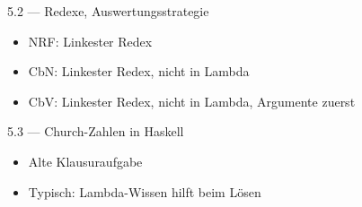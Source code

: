 \documentclass{beamer}
\begin{document}
\begin{frame}{5.2 --- Redexe, Auswertungsstrategie}

    \begin{itemize}
        \item NRF: Linkester Redex
        \item CbN: Linkester Redex, nicht in Lambda
        \item CbV: Linkester Redex, nicht in Lambda, Argumente zuerst
    \end{itemize}
\end{frame}

\begin{frame}{5.3 --- Church-Zahlen in Haskell}

    \begin{itemize}
        \item Alte Klausuraufgabe
        \item Typisch: Lambda-Wissen hilft beim Lösen
    \end{itemize}
\end{frame}
\end{document}
